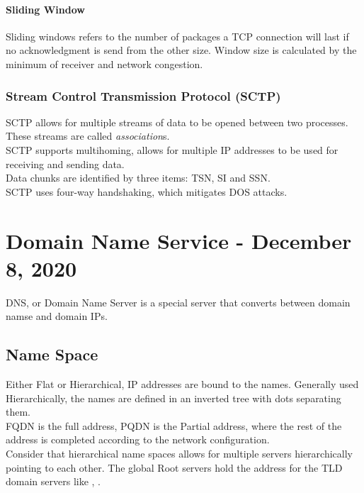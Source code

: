 \documentclass[11pt,a4paper,twoside]{book}
\begin{document}
\subsubsection{Sliding Window}

Sliding windows refers to the number of packages a TCP connection will last if no acknowledgment is send from the other size. Window size is calculated by the minimum of receiver and network congestion.

\subsection{Stream Control Transmission Protocol (SCTP)}

SCTP allows for multiple streams of data to be opened between two processes. These streams are called \textit{association}s.\\

SCTP supports multihoming, allows for multiple IP addresses to be used for receiving and sending data.\\

Data chunks are identified by three items: TSN, SI and SSN.\\

SCTP uses four-way handshaking, which mitigates DOS attacks.

\chapter{Domain Name Service - December 8, 2020}

DNS, or Domain Name Server is a special server that converts between domain namse and domain IPs.

\section{Name Space}

Either Flat or Hierarchical, IP addresses are bound to the names. Generally used Hierarchically, the names are defined in an inverted tree with dots separating them.\\

FQDN is the full address, PQDN is the Partial address, where the rest of the address is completed according to the network configuration.\\

Consider that hierarchical name spaces allows for multiple servers hierarchically pointing to each other. The global Root servers hold the address for the TLD domain servers like , .\\
\end{document}
